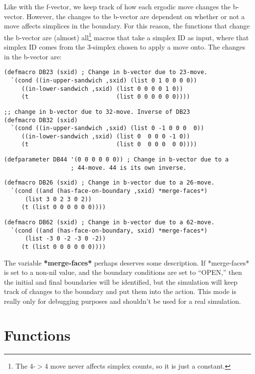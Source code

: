 \message{ !name(programmers_guide.tex)}\documentclass[12pt]{article}
\begin{document}
Like with the f-vector, we keep track of how each ergodic move changes
the b-vector. However, the changes to the b-vector are dependent on
whether or not a move affects simplices in the boundary. For this
reason, the functions that change the b-vector are (almost)
all\footnote{The 4-$>$4 move never affects simplex counts, so it is
  just a constant.} macros that take a simplex ID as input, where that
simplex ID comes from the 3-simplex chosen to apply a move onto. The changes in the b-vector are:
\begin{lstlisting}
(defmacro DB23 (sxid) ; Change in b-vector due to 23-move.
  `(cond ((in-upper-sandwich ,sxid) (list 0 1 0 0 0 0))
	 ((in-lower-sandwich ,sxid) (list 0 0 0 0 1 0))
	 (t                         (list 0 0 0 0 0 0))))
\end{lstlisting}
\begin{lstlisting}
;; change in b-vector due to 32-move. Inverse of DB23
(defmacro DB32 (sxid) 
  `(cond ((in-upper-sandwich ,sxid) (list 0 -1 0 0 0  0))
	 ((in-lower-sandwich ,sxid) (list 0  0 0 0 -1 0))
	 (t                         (list 0  0 0 0  0 0))))
\end{lstlisting}
\begin{lstlisting}
(defparameter DB44 '(0 0 0 0 0 0)) ; Change in b-vector due to a
				   ; 44-move. 44 is its own inverse.
\end{lstlisting}
\begin{lstlisting}
(defmacro DB26 (sxid) ; Change in b-vector due to a 26-move.
  `(cond ((and (has-face-on-boundary ,sxid) *merge-faces*)
	  (list 3 0 2 3 0 2))
	 (t (list 0 0 0 0 0 0))))
\end{lstlisting}
\begin{lstlisting}
(defmacro DB62 (sxid) ; Change in b-vector due to a 62-move.
  `(cond ((and (has-face-on-boundary, sxid) *merge-faces*)
	  (list -3 0 -2 -3 0 -2))
	 (t (list 0 0 0 0 0 0))))
\end{lstlisting}

The variable \textbf{*merge-faces*} perhaps deserves some
description. If *merge-faces* is set to a non-nil value, and the
boundary conditions are set to ``OPEN,'' then the initial and final
boundaries will be identified, but the simulation will keep track of
changes to the boundary and put them into the action. This mode is
really only for debugging purposes and shouldn't be used for a real
simulation.


\section{Functions}
\label{s:functions}
\end{document}
